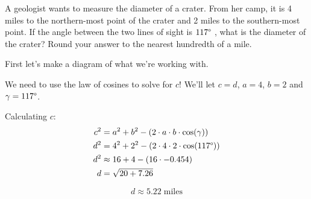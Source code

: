 \begin{problem}[19]
    A geologist wants to measure the diameter of a crater. From her camp, it is 4 miles to the northern-most point of the crater and 2 miles to the southern-most point. If the angle between the two lines of sight is $117\degree$ , what is the diameter of the crater? Round your answer to the nearest hundredth of a mile.
\end{problem}

\begin{solution}
    First let's make a diagram of what we're working with. \bigskip
    
    
    We need to use the law of cosines to solve for $c$! We'll let $c = d$, $a = 4$, $b = 2$ and $\gamma = 117\degree$. \medskip
    
    Calculating $c$:
    \begin{align}
        c^2 &= a^2 + b^2 - (2 \cdot a \cdot b \cdot \cos(\gamma)) \\
        d^2 &= 4^2 + 2^2 - (2 \cdot 4 \cdot 2 \cdot \cos(117\degree)) \\
        d^2 &\approx 16 + 4 - (16 \cdot -0.454)\\
        d &= \sqrt{20 + 7.26}
    \end{align}
    
    \[\boxed{d \approx 5.22 \; \text{miles}}\]
\end{solution}